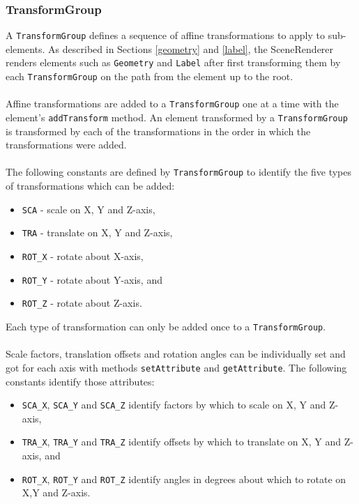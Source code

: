 \documentclass[10pt,aps, prb,preprint]{article}
\begin{document}
\subsubsection{TransformGroup}
\label{transformGroup}
A \texttt{TransformGroup} defines a sequence of affine transformations to apply to sub-elements. As described in Sections \ref{geometry} and \ref{label}, the SceneRenderer renders elements such as \texttt{Geometry} and \texttt{Label} after first transforming them by each \texttt{TransformGroup} on the path from the element up to the root.
\\
\\
Affine transformations are added to a \texttt{TransformGroup} one at a time with the element's \texttt{addTransform} method. An element transformed by a \texttt{TransformGroup} is transformed by each of the transformations in the order in which the transformations were added.
\\
\\
 The following constants are defined by \texttt{TransformGroup} to identify the five types of transformations which can be added:
\begin{itemize}
\item \texttt{SCA} - scale on X, Y and Z-axis,
\item \texttt{TRA} - translate on X, Y and Z-axis,
\item \texttt{ROT\_X} - rotate about X-axis,
\item \texttt{ROT\_Y} - rotate about Y-axis, and
\item \texttt{ROT\_Z} - rotate about Z-axis.
\end{itemize}
Each type of transformation can only be added once to a \texttt{TransformGroup}.
\\
\\
Scale factors, translation offsets and rotation angles can be individually set and got for each axis with methods \texttt{setAttribute} and \texttt{getAttribute}. The following constants identify those attributes:
\begin{itemize}
\item \texttt{SCA\_X}, \texttt{SCA\_Y} and \texttt{SCA\_Z} identify factors by which to scale on X, Y and Z-axis,
\item \texttt{TRA\_X}, \texttt{TRA\_Y} and \texttt{TRA\_Z} identify offsets by which to translate on X, Y and Z-axis, and
\item \texttt{ROT\_X}, \texttt{ROT\_Y} and \texttt{ROT\_Z} identify angles in degrees about which to rotate on X,Y and Z-axis.
\end{itemize}
\end{document}
